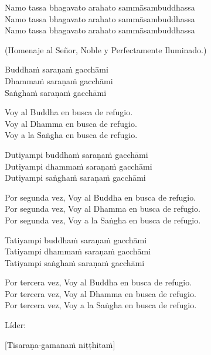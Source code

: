 Namo tassa bhagavato arahato sammāsambuddhassa\\
Namo tassa bhagavato arahato sammāsambuddhassa\\
Namo tassa bhagavato arahato sammāsambuddhassa

\begin{english}
  (Homenaje al Señor, Noble y Perfectamente Iluminado.)\\
\end{english}

Buddhaṁ saraṇaṁ gacchāmi\\
Dhammaṁ saraṇaṁ gacchāmi\\
Saṅghaṁ saraṇaṁ gacchāmi

\begin{english}
  Voy al Buddha en busca de refugio.\\
  Voy al Dhamma en busca de refugio.\\
  Voy a la Saṅgha en busca de refugio.
\end{english}

Dutiyampi buddhaṁ saraṇaṁ gacchāmi\\
Dutiyampi dhammaṁ saraṇaṁ gacchāmi\\
Dutiyampi saṅghaṁ saraṇaṁ gacchāmi

\begin{english}
 Por segunda vez, Voy al Buddha en busca de refugio.\\
 Por segunda vez, Voy al Dhamma en busca de refugio.\\
 Por segunda vez, Voy a la Saṅgha en busca de refugio.
\end{english}

Tatiyampi buddhaṁ saraṇaṁ gacchāmi\\
Tatiyampi dhammaṁ saraṇaṁ gacchāmi\\
Tatiyampi saṅghaṁ saraṇaṁ gacchāmi

\clearpage

\begin{english}
 Por tercera vez, Voy al Buddha en busca de refugio.\\
 Por tercera vez, Voy al Dhamma en busca de refugio.\\
 Por tercera vez, Voy a la Saṅgha en busca de refugio.
\end{english}

\begin{instruction}
  Líder:
\end{instruction}

[Tisaraṇa-gamanaṁ niṭṭhitaṁ]

